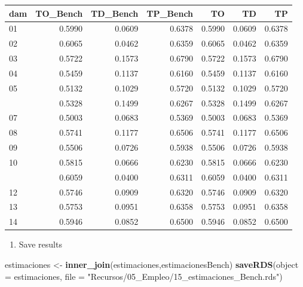 \documentclass[
  12pt,
]{book}
\newenvironment{Shaded}{\begin{snugshade}}{\end{snugshade}}
\newcommand{\AttributeTok}[1]{\textcolor[rgb]{0.13,0.29,0.53}{#1}}
\newcommand{\FunctionTok}[1]{\textcolor[rgb]{0.13,0.29,0.53}{\textbf{#1}}}
\newcommand{\NormalTok}[1]{#1}
\newcommand{\OtherTok}[1]{\textcolor[rgb]{0.56,0.35,0.01}{#1}}
\newcommand{\StringTok}[1]{\textcolor[rgb]{0.31,0.60,0.02}{#1}}
\providecommand{\tightlist}{%
  \setlength{\itemsep}{0pt}\setlength{\parskip}{0pt}}
\begin{document}
\begin{table}[H]
\centering
\centering
\begin{tabular}[t]{lrrrrrr}
\toprule
dam & TO\_Bench & TD\_Bench & TP\_Bench & TO & TD & TP\\
\midrule
01 & 0.5990 & 0.0609 & 0.6378 & 0.5990 & 0.0609 & 0.6378\\
02 & 0.6065 & 0.0462 & 0.6359 & 0.6065 & 0.0462 & 0.6359\\
03 & 0.5722 & 0.1573 & 0.6790 & 0.5722 & 0.1573 & 0.6790\\
04 & 0.5459 & 0.1137 & 0.6160 & 0.5459 & 0.1137 & 0.6160\\
05 & 0.5132 & 0.1029 & 0.5720 & 0.5132 & 0.1029 & 0.5720\\
\addlinespace
06 & 0.5328 & 0.1499 & 0.6267 & 0.5328 & 0.1499 & 0.6267\\
07 & 0.5003 & 0.0683 & 0.5369 & 0.5003 & 0.0683 & 0.5369\\
08 & 0.5741 & 0.1177 & 0.6506 & 0.5741 & 0.1177 & 0.6506\\
09 & 0.5506 & 0.0726 & 0.5938 & 0.5506 & 0.0726 & 0.5938\\
10 & 0.5815 & 0.0666 & 0.6230 & 0.5815 & 0.0666 & 0.6230\\
\addlinespace
11 & 0.6059 & 0.0400 & 0.6311 & 0.6059 & 0.0400 & 0.6311\\
12 & 0.5746 & 0.0909 & 0.6320 & 0.5746 & 0.0909 & 0.6320\\
13 & 0.5753 & 0.0951 & 0.6358 & 0.5753 & 0.0951 & 0.6358\\
14 & 0.5946 & 0.0852 & 0.6500 & 0.5946 & 0.0852 & 0.6500\\
\bottomrule
\end{tabular}
\end{table}

\begin{enumerate}
\def\labelenumi{\arabic{enumi}.}
\setcounter{enumi}{8}
\tightlist
\item
  Save results
\end{enumerate}

\begin{Shaded}
\begin{Highlighting}[]
\NormalTok{estimaciones }\OtherTok{\textless{}{-}} \FunctionTok{inner\_join}\NormalTok{(estimaciones,estimacionesBench)}
\FunctionTok{saveRDS}\NormalTok{(}\AttributeTok{object =}\NormalTok{ estimaciones, }\AttributeTok{file =} \StringTok{"Recursos/05\_Empleo/15\_estimaciones\_Bench.rds"}\NormalTok{)}
\end{Highlighting}
\end{Shaded}
\end{document}
